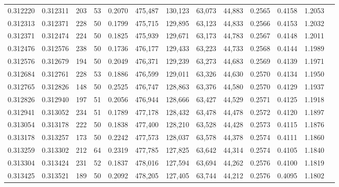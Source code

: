 \begin{tabular}{rrrrrrrrrrrrr}
0.312220 & 0.312311 &   203 &  53 &                                     0.2070 & 475,487 & 130,123 &  63,073 &  44,883 & 0.2565 & 0.4158 & 1.2053 \\
0.312313 & 0.312371 &   228 &  50 &                                     0.1799 & 475,715 & 129,895 &  63,123 &  44,833 & 0.2566 & 0.4153 & 1.2032 \\
0.312371 & 0.312474 &   224 &  50 &                                     0.1825 & 475,939 & 129,671 &  63,173 &  44,783 & 0.2567 & 0.4148 & 1.2011 \\
0.312476 & 0.312576 &   238 &  50 &                                     0.1736 & 476,177 & 129,433 &  63,223 &  44,733 & 0.2568 & 0.4144 & 1.1989 \\
0.312576 & 0.312679 &   194 &  50 &                                     0.2049 & 476,371 & 129,239 &  63,273 &  44,683 & 0.2569 & 0.4139 & 1.1971 \\
0.312684 & 0.312761 &   228 &  53 &                                     0.1886 & 476,599 & 129,011 &  63,326 &  44,630 & 0.2570 & 0.4134 & 1.1950 \\
0.312765 & 0.312826 &   148 &  50 &                                     0.2525 & 476,747 & 128,863 &  63,376 &  44,580 & 0.2570 & 0.4129 & 1.1937 \\
0.312826 & 0.312940 &   197 &  51 &                                     0.2056 & 476,944 & 128,666 &  63,427 &  44,529 & 0.2571 & 0.4125 & 1.1918 \\
0.312941 & 0.313052 &   234 &  51 &                                     0.1789 & 477,178 & 128,432 &  63,478 &  44,478 & 0.2572 & 0.4120 & 1.1897 \\
0.313054 & 0.313178 &   222 &  50 &                                     0.1838 & 477,400 & 128,210 &  63,528 &  44,428 & 0.2573 & 0.4115 & 1.1876 \\
0.313178 & 0.313257 &   173 &  50 &                                     0.2242 & 477,573 & 128,037 &  63,578 &  44,378 & 0.2574 & 0.4111 & 1.1860 \\
0.313259 & 0.313302 &   212 &  64 &                                     0.2319 & 477,785 & 127,825 &  63,642 &  44,314 & 0.2574 & 0.4105 & 1.1840 \\
0.313304 & 0.313424 &   231 &  52 &                                     0.1837 & 478,016 & 127,594 &  63,694 &  44,262 & 0.2576 & 0.4100 & 1.1819 \\
0.313425 & 0.313521 &   189 &  50 &                                     0.2092 & 478,205 & 127,405 &  63,744 &  44,212 & 0.2576 & 0.4095 & 1.1802 \\

\end{tabular}
